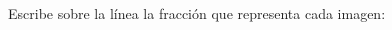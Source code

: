 \documentclass[12pt,addpoints]{evalua}
\begin{document}
\begin{questions}
\begin{multicols}{2}
    \end{multicols}
  
    \newpage
    \question[4] Escribe sobre la línea la fracción que representa cada imagen:
  
    \begin{multicols}{2}
\end{multicols}
\end{questions}
\end{document}

